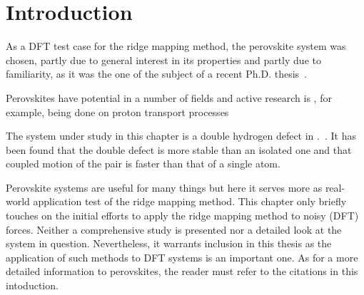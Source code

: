 \section{Introduction}
\label{sec:perovskites-introduction}

As a DFT test case for the ridge mapping method, the  perovskite system was chosen, partly due to general interest in its properties and partly due to familiarity, as it was the one of the subject of a recent Ph.D. thesis~\cite{nicolai-2010}.

Perovskites have potential in a number of fields and active research is , for example, being done on proton transport processes~\cite{perovskites-hydrogen-diffusion-2007, perovskites-proton-transport-2008}

The system under study in this chapter is a double hydrogen defect in .~\cite{double-defect-2011}.
It has been found that the double defect is more stable than an isolated one and that coupled motion of the pair is faster than that of a single atom.

Perovskite systems are useful for many things but here it serves more as real-world application test of the ridge mapping method.
This chapter only briefly touches on the initial efforts to apply the ridge mapping method to noisy (DFT) forces.
Neither a comprehensive study is presented nor a detailed look at the system in question.
Nevertheless, it warrants inclusion in this thesis as the application of such methods to DFT systems is an important one.
As for a more detailed information to perovskites, the reader must refer to the citations in this intoduction.





